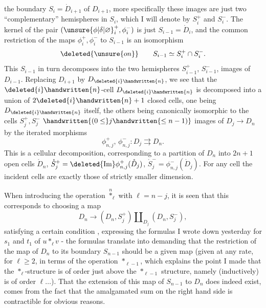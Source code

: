 the boundary  $S_i=\dot{D}_{i+1}$ of $D_{i+1}$, more specifically these images are just two ``complementary'' hemispheres in $S_i$, which I will denote by $S_i^+$ and $S_i^-$. The kernel of the pair $({\unsure{\phi|\delta|\varnothing}}_i^+,\phi_i^-)$ is just $S_{i-1}=\mathring{D}_i$, and the common restriction of the maps $\phi_i^+,\phi_i^-$ to $S_{i-1}$ is an isomorphism
\[
\deleted{\unsure{on}}\qquad S_{i-1}\simeq S_i^+\cap S_i^-.
\]
This $S_{i-1}$ in turn decomposes into the two hemispheres $S_{i-1}^+$, $S_{i-1}^-$, images of $D_{i-1}$. Replacing $D_{i+1}$ by $D_{\deleted{i}\handwritten{n}}$, we see that the $\deleted{i}\handwritten{n}$-cell $D_{\deleted{i}\handwritten{n}}$ is decomposed into a union of $2\deleted{i}\handwritten{n}+1$ closed cells, one being $D_{\deleted{i}\handwritten{n}}$ itself, the others being canonically isomorphic to the cells $S_j^+,S_j^-$ $\handwritten{(0\leq}j\handwritten{\leq n-1)}$ images of $D_j\to D_n$ by the iterated morphisms
\[
\phi_{n,j}^+,\,\phi_{n,j}^-:D_j\rightrightarrows D_n.
\]
This is a cellular decomposition, corresponding to a partition of $D_n$ into $2n+1$ open cells $\mathring{D}_n$, $\mathring{S}_j^+=\deleted{\mathrm{Im}}\phi_{n,j}^+(\mathring{D}_j)$, $\mathring{S}_j^-=\phi_{n,j}^-(\mathring{D}_j)$. For any cell  the incident cells are exactly those of strictly smaller dimension.

When introducing the operation $\overset{n}{*}_\ell$ with $\ell=n-j$, it is seen that this corresponds to choosing a map
\[
D_n\longrightarrow(D_n,S_j^+)\amalg_{D_j}(D_n,S_j^-),
\]
satisfying a certain condition , expressing the formulas I wrote down yesterday for $s_1$ and $t_1$ of $u*_\ell v$  - the  formulas translate into demanding that the restriction of the  map of $D_n$ to its boundary $S_{n-1}$ should be a given map (given at any rate, for $\ell\geq2$, in terms of the operation $*_{\ell-1}$,  which explains the point I made that the $*_\ell$-structure is of order just above the $*_{\ell-1}$ structure, namely (inductively) is of order $\ell\ldots$). That the extension of this map of $S_{n-1}$ to $D_n$ does indeed exist, comes from the fact that the amalgamated sum on the right hand side is contractible for obvious reasons.

